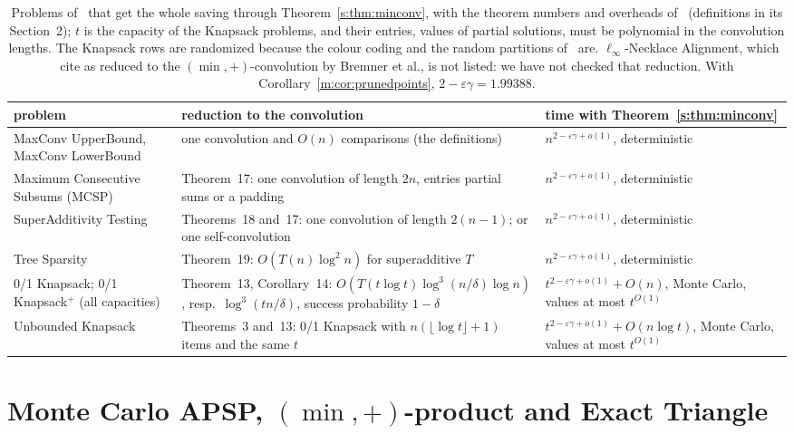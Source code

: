 \documentclass[11pt]{article}
\theoremstyle{definition}
\theoremstyle{remark}
\newcommand{\ExpThreeSumBest}{1.99388}%
\begin{document}
\begin{table}[ht]
\centering\small
\renewcommand{\arraystretch}{1.15}\setlength{\tabcolsep}{4pt}
\begin{tabular}{@{}>{\raggedright}p{}>{\raggedright}p{}>{\raggedright\arraybackslash}p{}@{}}
problem & reduction to the convolution~\cite{CMWW19} & time with Theorem~\ref{s:thm:minconv}\\\hline
MaxConv UpperBound, MaxConv LowerBound & one convolution and $O(n)$ comparisons (the definitions) & $n^{2-\varepsilon\gamma+o(1)}$, deterministic\\
Maximum Consecutive Subsums (MCSP) & Theorem~17: one convolution of length $2n$, entries partial sums or a padding & $n^{2-\varepsilon\gamma+o(1)}$, deterministic\\
SuperAdditivity Testing & Theorems~18 and~17: one convolution of length $2(n-1)$; or one self-convolution & $n^{2-\varepsilon\gamma+o(1)}$, deterministic\\
Tree Sparsity & Theorem~19: $O(T(n)\log^2n)$ for superadditive $T$ & $n^{2-\varepsilon\gamma+o(1)}$, deterministic\\
0/1 Knapsack; 0/1 Knapsack$^+$ (all capacities) & Theorem~13, Corollary~14: $O(T(t\log t)\log^3(n/\delta)\log n)$, resp.\ $\log^3(tn/\delta)$, success probability $1-\delta$ & $t^{2-\varepsilon\gamma+o(1)}+O(n)$, Monte Carlo, values at most $t^{O(1)}$\\
Unbounded Knapsack & Theorems~3 and~13: 0/1 Knapsack with $n(\lfloor\log t\rfloor+1)$ items and the same $t$ & $t^{2-\varepsilon\gamma+o(1)}+O(n\log t)$, Monte Carlo, values at most $t^{O(1)}$
\end{tabular}
\caption{Problems of~\cite{CMWW19} that get the whole saving through Theorem~\ref{s:thm:minconv}, with the theorem numbers and overheads of~\cite{CMWW19} (definitions in its Section~2); $t$ is the capacity of the Knapsack problems, and their entries, values of partial solutions, must be polynomial in the convolution lengths. The Knapsack rows are randomized because the colour coding and the random partitions of~\cite[Lemmas~11, 12]{CMWW19} are. $\ell_\infty$-Necklace Alignment, which~\cite{CMWW19} cite as reduced to the $(\min,+)$-convolution by Bremner et al., is not listed: we have not checked that reduction. With Corollary~\ref{m:cor:prunedpoints}, $2-\varepsilon\gamma=\ExpThreeSumBest$.}
\label{s:tab:class}
\end{table}

\section{Monte Carlo APSP, \texorpdfstring{$(\min,+)$}{(min,+)}-product and Exact Triangle}\label{t:sec:apsp}
\end{document}
